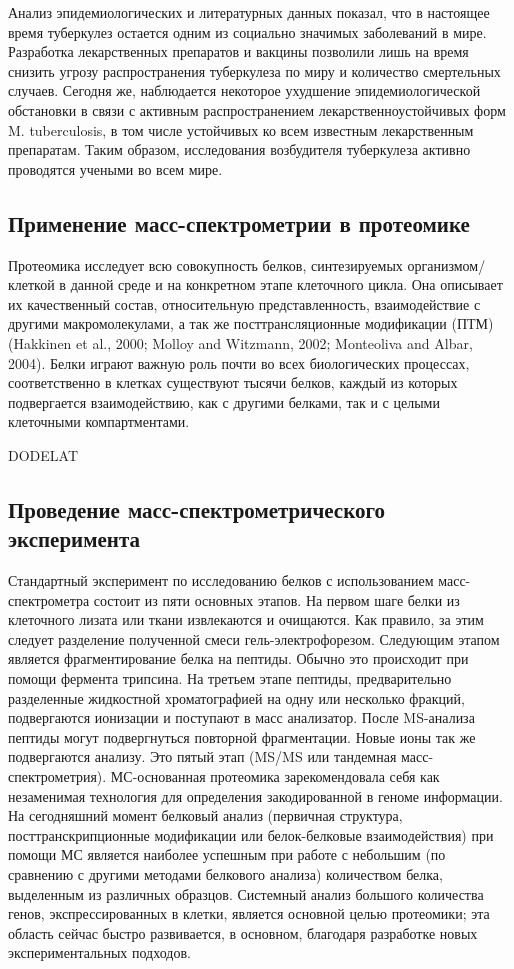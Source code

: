 Анализ эпидемиологических и литературных данных показал, что в настоящее время туберкулез остается одним из социально значимых заболеваний в мире. Разработка лекарственных препаратов и вакцины позволили лишь на время снизить угрозу распространения туберкулеза по миру и количество смертельных случаев. Сегодня же, наблюдается некоторое ухудшение эпидемиологической обстановки в связи с активным распространением лекарственноустойчивых форм M. tuberculosis, в том числе устойчивых ко всем известным лекарственным препаратам. Таким образом, исследования возбудителя туберкулеза активно проводятся учеными во всем мире.


\subsection{Применение масс-спектрометрии в протеомике}
Протеомика исследует всю совокупность белков, синтезируемых организмом/клеткой в данной среде и на конкретном этапе клеточного цикла. Она описывает их качественный состав, относительную представленность, взаимодействие с другими макромолекулами, а так же посттрансляционные модификации (ПТМ) (Hakkinen et al., 2000; Molloy and Witzmann, 2002; Monteoliva and Albar, 2004). Белки играют важную роль почти во всех биологических процессах, соответственно в клетках существуют тысячи белков, каждый из которых подвергается взаимодействию, как с другими белками, так и с целыми клеточными компартментами.

DODELAT

\subsection{Проведение масс-спектрометрического эксперимента}
Стандартный эксперимент по исследованию белков с использованием масс-спектрометра состоит из пяти основных этапов. На первом шаге белки из клеточного лизата или ткани извлекаются и очищаются. Как правило, за этим следует разделение полученной смеси гель-электрофорезом. Следующим этапом является фрагментирование белка на пептиды. Обычно это происходит при помощи фермента трипсина. На третьем этапе пептиды, предварительно разделенные жидкостной хроматографией на одну или несколько фракций, подвергаются ионизации и поступают в масс анализатор. После MS-анализа пептиды могут подвергнуться повторной фрагментации. Новые ионы так же подвергаются анализу. Это пятый этап (MS/MS или тандемная масс-спектрометрия). МС-основанная протеомика зарекомендовала себя как незаменимая технология для определения закодированной в геноме информации. На сегодняшний момент белковый анализ (первичная структура, посттранскрипционные модификации или белок-белковые взаимодействия) при помощи МС является наиболее успешным при работе с небольшим (по сравнению с другими методами белкового анализа) количеством белка, выделенным из различных образцов. Системный анализ большого количества генов, экспрессированных в клетки, является основной целью протеомики; эта область сейчас быстро развивается, в основном, благодаря разработке новых экспериментальных подходов.

